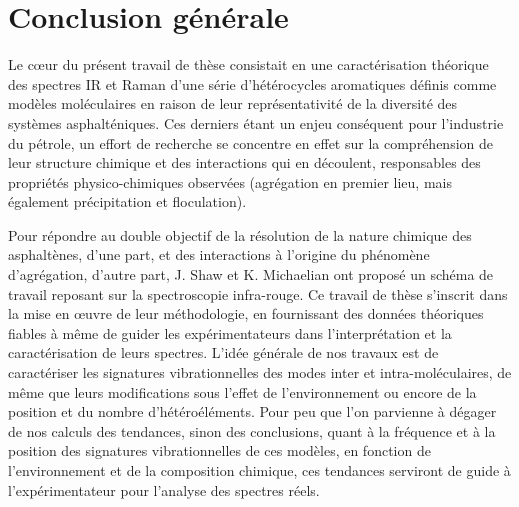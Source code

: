 

	\chapter*{Conclusion générale}
	\minitoc
	\restoregeometry
	
	
	
	Le cœur du présent travail de thèse consistait en une caractérisation théorique des spectres IR et Raman d'une série d'hétérocycles aromatiques définis comme modèles moléculaires en raison de leur représentativité de la diversité des systèmes asphalténiques. Ces derniers étant un enjeu conséquent pour l'industrie du pétrole, un effort de recherche se concentre en effet sur la compréhension de leur structure chimique et des interactions qui en découlent, responsables des propriétés physico-chimiques observées (agrégation en premier lieu, mais également précipitation et floculation). 
	
	Pour répondre au double objectif de la résolution de la nature chimique des asphaltènes, d'une part, et des interactions à l'origine du phénomène d'agrégation, d'autre part, J. Shaw et K. Michaelian ont proposé un schéma de travail reposant sur la spectroscopie infra-rouge. Ce travail de thèse s'inscrit dans la mise en œuvre de leur méthodologie, en fournissant des données théoriques fiables à même de guider les expérimentateurs dans l'interprétation et la caractérisation de leurs spectres. L'idée générale de nos travaux est de caractériser les signatures vibrationnelles des modes inter et intra-moléculaires, de même que leurs modifications sous l'effet de l'environnement ou encore de la position et du nombre d'hétéroéléments. Pour peu que l'on parvienne à dégager de nos calculs des tendances, sinon des conclusions, quant à la fréquence et à la position des signatures vibrationnelles de ces modèles, en fonction de l'environnement et de la composition chimique, ces tendances serviront de guide à l'expérimentateur pour l'analyse des spectres réels.  
	
